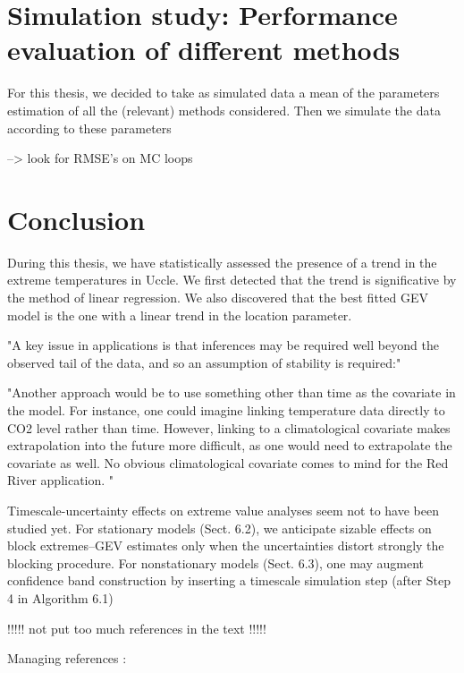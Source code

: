 \documentclass[11pt,a4paper,openany ]{book}
\begin{document}
\chapter{Simulation study: Performance evaluation of different methods}
\thispagestyle{empty}


For this thesis, we decided to take as simulated data a mean of the parameters estimation  of all the (relevant) methods considered. 
Then we simulate the data according to these parameters 

--> look for RMSE's on MC loops



\chapter{Conclusion}
\thispagestyle{empty}

During this thesis, we have statistically assessed the presence of a trend in the extreme temperatures in Uccle. We first detected that the trend is significative by the method of linear regression. We also discovered that the best fitted GEV model is the one with a linear trend in the location parameter.

"A key issue in applications is that inferences
may be required well beyond the observed tail of
the data, and so an assumption of stability is required:" \cite{davison_statistical_2012}

"Another approach would be to use something other than time as the covariate 
in the model. For instance, one could imagine linking temperature data directly to
CO2 level rather than time. However, linking to a climatological covariate makes
extrapolation into the future more difficult, as one would need to extrapolate the 
covariate as well. No obvious climatological covariate comes to mind for the Red
River application. " %


Timescale-uncertainty effects on extreme value analyses seem not to have been
studied yet. For stationary models (Sect. 6.2), we anticipate sizable effects on block
extremes–GEV estimates only when the uncertainties distort strongly the blocking
procedure. For nonstationary models (Sect. 6.3), one may augment confidence band
construction by inserting a timescale simulation step (after Step 4 in Algorithm 6.1) \citet[pp.262]{mudelsee_climate_2014}

!!!!! not put too much references in the text !!!!!

Managing references : 
\end{document}
